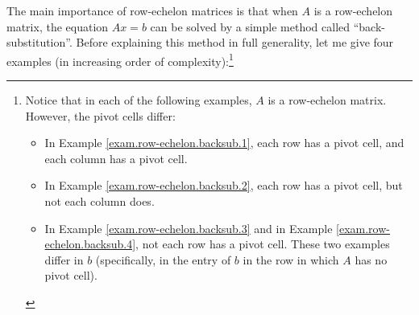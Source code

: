 \documentclass[numbers=enddot,12pt,final,onecolumn,notitlepage]{scrartcl}%
\theoremstyle{definition}
\begin{document}
The main importance of row-echelon matrices is that when $A$ is a row-echelon
matrix, the equation $Ax=b$ can be solved by a simple method called
\textquotedblleft back-substitution\textquotedblright. Before explaining this
method in full generality, let me give four examples (in increasing order of
complexity):\footnote{Notice that in each of the following examples, $A$ is a
row-echelon matrix. However, the pivot cells differ:
\par
\begin{itemize}
\item In Example \ref{exam.row-echelon.backsub.1}, each row has a pivot cell,
and each column has a pivot cell.
\par
\item In Example \ref{exam.row-echelon.backsub.2}, each row has a pivot cell,
but not each column does.
\par
\item In Example \ref{exam.row-echelon.backsub.3} and in Example
\ref{exam.row-echelon.backsub.4}, not each row has a pivot cell. These two
examples differ in $b$ (specifically, in the entry of $b$ in the row in which
$A$ has no pivot cell).
\end{itemize}
}
\end{document}
